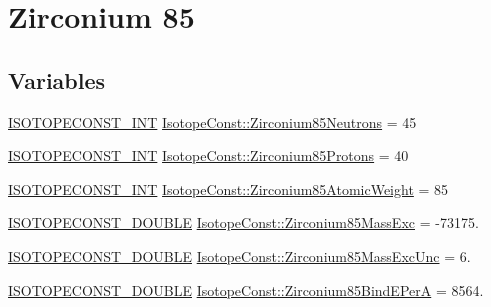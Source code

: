 \hypertarget{group___isotope_const-_zirconium-_zr85}{}\section{Zirconium 85}
\label{group___isotope_const-_zirconium-_zr85}
\subsection*{Variables}
\begin{DoxyCompactItemize}
\item 
\mbox{\hyperlink{group___isotope_const-_macros_ga5f18360b3e99483a35c32d789e62621c}{I\+S\+O\+T\+O\+P\+E\+C\+O\+N\+S\+T\+\_\+\+I\+NT}} \mbox{\hyperlink{group___isotope_const-_zirconium-_zr85_gab2d2977dfb51fd7471ba0bc0987049d8}{Isotope\+Const\+::\+Zirconium85\+Neutrons}} = 45
\item 
\mbox{\hyperlink{group___isotope_const-_macros_ga5f18360b3e99483a35c32d789e62621c}{I\+S\+O\+T\+O\+P\+E\+C\+O\+N\+S\+T\+\_\+\+I\+NT}} \mbox{\hyperlink{group___isotope_const-_zirconium-_zr85_gacde07b7224cf4e323eb0b66bfc127328}{Isotope\+Const\+::\+Zirconium85\+Protons}} = 40
\item 
\mbox{\hyperlink{group___isotope_const-_macros_ga5f18360b3e99483a35c32d789e62621c}{I\+S\+O\+T\+O\+P\+E\+C\+O\+N\+S\+T\+\_\+\+I\+NT}} \mbox{\hyperlink{group___isotope_const-_zirconium-_zr85_ga74fa454ab1ab4cb33fc7972ab07d1614}{Isotope\+Const\+::\+Zirconium85\+Atomic\+Weight}} = 85
\item 
\mbox{\hyperlink{group___isotope_const-_macros_ga8f45a7272ce02c0b4c65c44636ed719a}{I\+S\+O\+T\+O\+P\+E\+C\+O\+N\+S\+T\+\_\+\+D\+O\+U\+B\+LE}} \mbox{\hyperlink{group___isotope_const-_zirconium-_zr85_gac2de37709a6e6af1137e1f51984d8698}{Isotope\+Const\+::\+Zirconium85\+Mass\+Exc}} = -\/73175.
\item 
\mbox{\hyperlink{group___isotope_const-_macros_ga8f45a7272ce02c0b4c65c44636ed719a}{I\+S\+O\+T\+O\+P\+E\+C\+O\+N\+S\+T\+\_\+\+D\+O\+U\+B\+LE}} \mbox{\hyperlink{group___isotope_const-_zirconium-_zr85_ga4718aff0a8a57b052d595223fe2a40e0}{Isotope\+Const\+::\+Zirconium85\+Mass\+Exc\+Unc}} = 6.
\item 
\mbox{\hyperlink{group___isotope_const-_macros_ga8f45a7272ce02c0b4c65c44636ed719a}{I\+S\+O\+T\+O\+P\+E\+C\+O\+N\+S\+T\+\_\+\+D\+O\+U\+B\+LE}} \mbox{\hyperlink{group___isotope_const-_zirconium-_zr85_ga1ef9813d2b8a2487a224eb1ef09a4963}{Isotope\+Const\+::\+Zirconium85\+Bind\+E\+PerA}} = 8564.
\item 

\end{DoxyCompactItemize}

